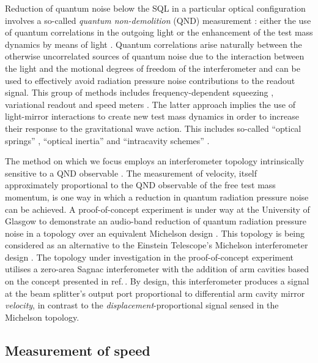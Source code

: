 Reduction of quantum noise below the SQL in a particular optical configuration involves a so-called \emph{quantum non-demolition} (\gls{QND}) measurement \cite{Braginsky1995}: either the use of quantum correlations in the outgoing light or the enhancement of the test mass dynamics by means of light \cite{Chen2011}. Quantum correlations arise naturally between the otherwise uncorrelated sources of quantum noise due to the interaction between the light and the motional degrees of freedom of the interferometer and can be used to effectively avoid radiation pressure noise contributions to the readout signal. This group of methods includes frequency-dependent squeezing \cite{Kimble2001}, variational readout \cite{Kimble2001, Vyatchanin1995, Vyatchanin1996} and speed meters \cite{Braginsky1990, Braginsky2000, Chen2003, Danilishin2004}. The latter approach implies the use of light-mirror interactions to create new test mass dynamics in order to increase their response to the gravitational wave action. This includes so-called ``optical springs'' \cite{Braginsky1999, Buonanno2002, Corbitt2007, Rehbein2008, Gordon2015}, ``optical inertia'' \cite{Khalili2011, Voronchev2012} and ``intracavity schemes'' \cite{Braginsky1997, Khalili2002, Danilishin2006}.
   
The method on which we focus employs an interferometer topology intrinsically sensitive to a QND observable \cite{Danilishin2012}. The measurement of velocity, itself approximately proportional to the QND observable of the free test mass momentum, is one way in which a reduction in quantum radiation pressure noise can be achieved. A proof-of-concept experiment is under way at the University of Glasgow to demonstrate an audio-band reduction of quantum radiation pressure noise in a \SSM{} topology over an equivalent Michelson design \cite{Graef2014}. This topology is being considered as an alternative to the Einstein Telescope's Michelson interferometer design \cite{MuellerEbhardt2009a, Voronchev2015}. The topology under investigation in the proof-of-concept experiment utilises a zero-area Sagnac interferometer with the addition of arm cavities based on the concept presented in ref.\,\cite{Chen2003}. By design, this interferometer produces a signal at the beam splitter's output port proportional to differential arm cavity mirror \emph{velocity}, in contrast to the \emph{displacement}-proportional signal sensed in the Michelson topology.

\subsection{Measurement of speed}



